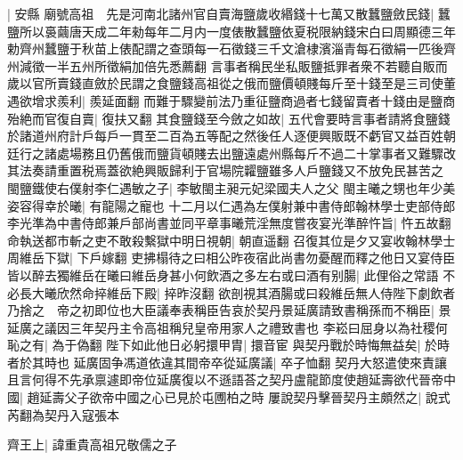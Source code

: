 |{
	安縣}
廟號高祖　先是河南北諸州官自賣海鹽歲收緡錢十七萬又散蠶鹽斂民錢|{
	蠶鹽所以裛繭唐天成二年勑每年二月内一度俵散蠶鹽依夏税限納錢宋白曰周顯德三年勅齊州蠶鹽于秋苗上俵配謂之查頭每一石徵錢三千文滄棣濱淄青每石徵絹一匹後齊州減徵一半五州所徵絹加倍先悉薦翻}
言事者稱民坐私販鹽抵罪者衆不若聽自販而歲以官所賣錢直斂於民謂之食鹽錢高祖從之俄而鹽價頓賤每斤至十錢至是三司使董遇欲增求羨利|{
	羨延面翻}
而難于驟變前法乃重征鹽商過者七錢留賣者十錢由是鹽商殆絶而官復自賣|{
	復扶又翻}
其食鹽錢至今斂之如故|{
	五代會要時言事者請將食鹽錢於諸道州府計戶每戶一貫至二百為五等配之然後任人逐便興販既不虧官又益百姓朝廷行之諸處場務且仍舊俄而鹽貨頓賤去出鹽遠處州縣每斤不過二十掌事者又難驟改其法奏請重置税焉蓋欲絶興販歸利于官場院糶鹽雖多人戶鹽錢又不放免民甚苦之}
閩鹽鐵使右僕射李仁遇敏之子|{
	李敏閩主昶元妃梁國夫人之父}
閩主曦之甥也年少美姿容得幸於曦|{
	有龍陽之寵也}
十二月以仁遇為左僕射兼中書侍郎翰林學士吏部侍郎李光準為中書侍郎兼戶部尚書並同平章事曦荒淫無度嘗夜宴光準醉忤旨|{
	忤五故翻}
命執送都市斬之吏不敢殺繫獄中明日視朝|{
	朝直遥翻}
召復其位是夕又宴收翰林學士周維岳下獄|{
	下戶嫁翻}
吏拂榻待之曰相公昨夜宿此尚書勿憂醒而釋之他日又宴侍臣皆以醉去獨維岳在曦曰維岳身甚小何飲酒之多左右或曰酒有别腸|{
	此俚俗之常語}
不必長大曦欣然命捽維岳下殿|{
	捽昨沒翻}
欲剖視其酒腸或曰殺維岳無人侍陛下劇飲者乃捨之　帝之初即位也大臣議奉表稱臣告哀於契丹景延廣請致書稱孫而不稱臣|{
	景延廣之議因三年契丹主令高祖稱兒皇帝用家人之禮致書也}
李崧曰屈身以為社稷何恥之有|{
	為于偽翻}
陛下如此他日必躬擐甲胄|{
	擐音宦}
與契丹戰於時悔無益矣|{
	於時者於其時也}
延廣固争馮道依違其間帝卒從延廣議|{
	卒子恤翻}
契丹大怒遣使來責讓且言何得不先承禀遽即帝位延廣復以不遜語荅之契丹盧龍節度使趙延壽欲代晉帝中國|{
	趙延壽父子欲帝中國之心已見於屯圑柏之時}
屢說契丹擊晉契丹主頗然之|{
	說式芮翻為契丹入寇張本}


齊王上|{
	諱重貴高祖兄敬儒之子}


